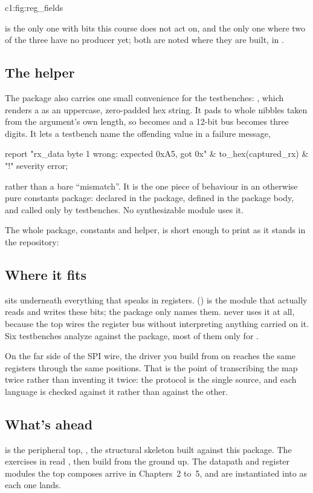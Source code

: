   {c1:fig:reg_fields}

 is the only one with bits this course does not act on, and  the only
one where two of the three have no producer yet; both are noted where they are built, in
.

\subsection{The  helper}
\label{c1:sec:to_hex}
The package also carries one small convenience for the testbenches: , which renders a
 as an uppercase, zero-padded hex string. It pads to whole nibbles taken from
the argument's own length, so  becomes  and a 12-bit bus becomes three
digits. It lets a testbench name the offending value in a failure message,

\begin{vhdlcode}
report "rx_data byte 1 wrong: expected 0xA5, got 0x" & to_hex(captured_rx) & "!"
    severity error;
\end{vhdlcode}

\noindent rather than a bare ``mismatch''. It is the one piece of behaviour in an otherwise pure
constants package: declared in the package, defined in the package body, and called only by
testbenches. No synthesizable module uses it.

The whole package, constants and helper, is short enough to print as it stands in the repository:


\subsection{Where it fits}
\label{c1:sec:uart_def_fits}
 sits underneath everything that speaks in registers. 
() is the module that actually reads and writes these bits; the package only names them.
 never uses it at all, because the top wires the register bus without interpreting
anything carried on it. Six testbenches analyze against the package, most of them only for
.

On the far side of the SPI wire, the driver you build from  on reaches the same
registers through the same positions. That is the point of transcribing the map twice rather than
inventing it twice: the protocol is the single source, and each language is checked against it
rather than against the other.

\subsection{What's ahead}
 is the peripheral top, , the structural skeleton built
against this package. The exercises in  read , then build
 from the ground up. The datapath and register modules the top composes arrive in
Chapters~2 to~5, and are instantiated into  as each one lands.
